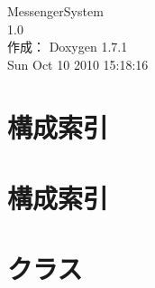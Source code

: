 \documentclass[a4paper]{book}
\begin{document}
\hypersetup{pageanchor=false}
\begin{titlepage}
\vspace*{7cm}
\begin{center}
{\Large MessengerSystem \\[1ex]\large 1.0 }\\
\vspace*{1cm}
{\large 作成： Doxygen 1.7.1}\\
\vspace*{0.5cm}
{\small Sun Oct 10 2010 15:18:16}\\
\end{center}
\end{titlepage}
\clearemptydoublepage
{}
\tableofcontents
\clearemptydoublepage
{}
\hypersetup{pageanchor=true}
\chapter{構成索引}

\chapter{構成索引}

\chapter{クラス}





\printindex
\end{document}
